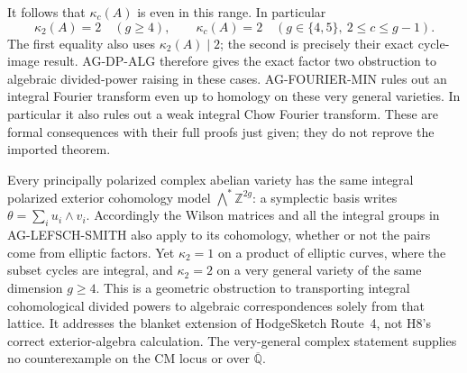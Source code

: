 It follows that $\kappa_c(A)$ is even in this range.
In particular
\[
 \kappa_2(A)=2\quad(g\ge4),\qquad
 \kappa_c(A)=2\quad(g\in\{4,5\},\ 2\le c\le g-1).
\]
The first equality also uses $\kappa_2(A)\mid2$;
the second is precisely their exact cycle-image result.
AG-DP-ALG therefore gives the exact factor two obstruction
to algebraic divided-power raising in these cases.
AG-FOURIER-MIN rules out an integral Fourier transform even
up to homology on these very general varieties.  In particular
it also rules out a weak integral Chow Fourier transform.
These are formal consequences with their full proofs just
given; they do not reprove the imported theorem.

Every principally polarized complex abelian variety has the
same integral polarized exterior cohomology model
$\bigwedge^*\mathbb Z^{2g}$: a symplectic basis writes
$\theta=\sum_i u_i\wedge v_i$.  Accordingly the Wilson
matrices and all the integral groups in AG-LEFSCH-SMITH
also apply to its cohomology, whether or not the pairs
come from elliptic factors.  Yet $\kappa_2=1$ on a product
of elliptic curves, where the subset cycles are integral,
and $\kappa_2=2$ on a very general variety of the same
dimension $g\ge4$.  This is a geometric obstruction to
transporting integral cohomological divided powers to
algebraic correspondences solely from that lattice.
It addresses the blanket extension of HodgeSketch Route~4,
not H8's correct exterior-algebra calculation.  The
very-general complex statement supplies no counterexample
on the CM locus or over $\overline{\mathbb Q}$.

